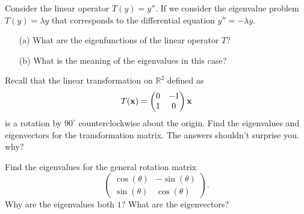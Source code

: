 \begin{problem}
    Consider the linear operator $T(y) = y''$.  If we consider the eigenvalue problem $T(y)
    = \lambda y$ that corresponds to the differential equation $y'' = -\lambda y$.  
    \begin{enumerate}
        \item[(a)] What are the eigenfunctions of the linear operator $T$?  
        \item[(b)] What is the meaning of the eigenvalues in this case?
    \end{enumerate}
\end{problem}

\begin{problem}
    Recall that the linear transformation on $\mathbb{R}^2$ defined as 
    \[ T({\bf x}) = \begin{pmatrix} 0 & -1 \\ 1 & 0 \end{pmatrix} {\bf x} \]
    is a rotation by $90^\circ$ counterclockwise about the origin.  Find the eigenvalues
    and eigenvectors
    for the transformation matrix.  The answers shouldn't surprise you.  why?
\end{problem}


\begin{problem}
    Find the eigenvalues for the general rotation matrix
    \[ \begin{pmatrix} \cos(\theta) & -\sin(\theta) \\ \sin(\theta) & \cos(\theta)
    \end{pmatrix}. \]
    Why are the eigenvalues both $1$?  What are the eigenvectors?
\end{problem}

